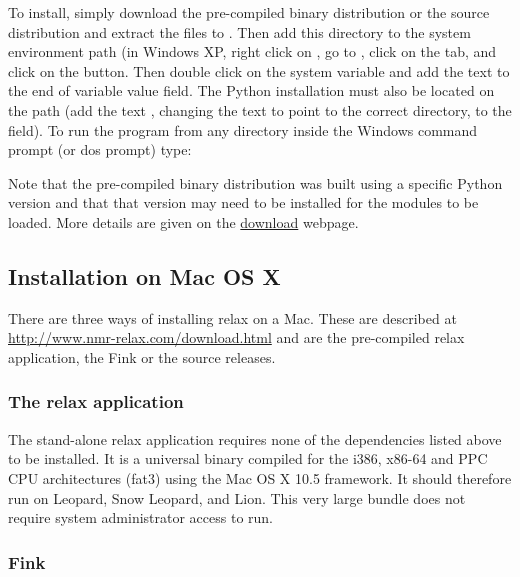 To install, simply download the pre-compiled binary distribution  or the source distribution  and extract the files to .
Then add this directory to the system environment path (in Windows XP, right click on , go to , click on the  tab, and click on the  button.
Then double click on the  system variable and add the text  to the end of variable value field.
The Python installation must also be located on the path (add the text , changing the text to point to the correct directory, to the field).
To run the program from any directory inside the Windows command prompt (or dos prompt) type:



Note that the pre-compiled binary distribution was built using a specific Python version and that that version may need to be installed for the modules to be loaded.
More details are given on the \href{http://www.nmr-relax.com/download.html}{download} webpage.


\subsection{Installation on Mac OS X}

There are three ways of installing relax on a Mac.
These are described at \href{http://www.nmr-relax.com/download.html}{http://www.nmr-relax.com/download.html} and are the pre-compiled relax application, the Fink or the source releases.

\subsubsection{The relax application}

The stand-alone relax application requires none of the dependencies listed above to be installed.
It is a universal binary compiled for the i386, x86-64 and PPC CPU architectures (fat3) using the Mac OS X 10.5 framework.
It should therefore run on Leopard, Snow Leopard, and Lion.
This very large bundle does not require system administrator access to run.

\subsubsection{Fink}

